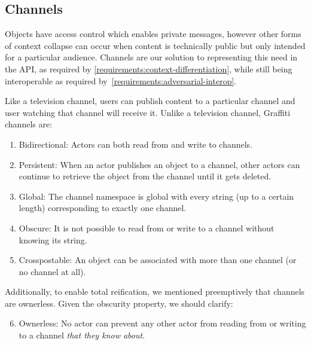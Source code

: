

\subsection{Channels}
\label{concepts:channels}

Objects have access control which enables private messages,
however other forms of context collapse can occur when
content is technically public but only intended for a particular audience.
Channels are our solution to representing this need in the API,
as required by \ref{requirements:context-differentiation},
while still being
interoperable as required by~\ref{requirements:adversarial-interop}.

Like a television channel, users can publish content to a particular channel
and user watching that channel will receive it.
Unlike a television channel, Graffiti channels are:

\begin{enumerate}
\item
Bidirectional: Actors can both read from and write to channels.
\item
Persistent: When an actor publishes an object to a channel, other actors can
continue to retrieve the object from the channel until it gets deleted.
\item
Global: The channel namespace is global with every string (up to a certain length)
corresponding to exactly one channel.
\item
Obscure: It is not possible to read from or write to a channel without knowing
its string.
\item
Crosspostable: An object can be associated with more than one channel (or no channel at all).
\end{enumerate}

Additionally, to enable total reification, we mentioned preemptively that channels are ownerless.
Given the obscurity property, we should clarify:

\begin{enumerate}
\setcounter{enumi}{5}
\item
Ownerless: No actor can prevent any other actor from reading from or writing to a channel
\emph{that they know about}.
\end{enumerate}


